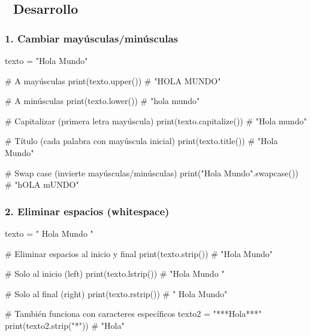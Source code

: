 \documentclass[
  doc,
  floatsintext,
  longtable,
  a4paper,
  nolmodern,
  notxfonts,
  notimes,
  12pt,
  colorlinks=true,linkcolor=blue,citecolor=blue,urlcolor=blue]{apa7}
\newenvironment{Shaded}{\begin{snugshade}}{\end{snugshade}}
\newcommand{\BuiltInTok}[1]{\textcolor[rgb]{0.00,0.23,0.31}{#1}}
\newcommand{\CommentTok}[1]{\textcolor[rgb]{0.37,0.37,0.37}{#1}}
\newcommand{\NormalTok}[1]{\textcolor[rgb]{0.00,0.23,0.31}{#1}}
\newcommand{\OperatorTok}[1]{\textcolor[rgb]{0.37,0.37,0.37}{#1}}
\newcommand{\StringTok}[1]{\textcolor[rgb]{0.13,0.47,0.30}{#1}}
\begin{document}
\subsection{📐 Desarrollo}\label{desarrollo}

\subsubsection{1. Cambiar
mayúsculas/minúsculas}\label{cambiar-mayuxfasculasminuxfasculas}

\begin{Shaded}
\begin{Highlighting}[]
\NormalTok{texto }\OperatorTok{=} \StringTok{"Hola Mundo"}

\CommentTok{\# A mayúsculas}
\BuiltInTok{print}\NormalTok{(texto.upper())   }\CommentTok{\# "HOLA MUNDO"}

\CommentTok{\# A minúsculas}
\BuiltInTok{print}\NormalTok{(texto.lower())   }\CommentTok{\# "hola mundo"}

\CommentTok{\# Capitalizar (primera letra mayúscula)}
\BuiltInTok{print}\NormalTok{(texto.capitalize())  }\CommentTok{\# "Hola mundo"}

\CommentTok{\# Título (cada palabra con mayúscula inicial)}
\BuiltInTok{print}\NormalTok{(texto.title())   }\CommentTok{\# "Hola Mundo"}

\CommentTok{\# Swap case (invierte mayúsculas/minúsculas)}
\BuiltInTok{print}\NormalTok{(}\StringTok{"Hola Mundo"}\NormalTok{.swapcase())  }\CommentTok{\# "hOLA mUNDO"}
\end{Highlighting}
\end{Shaded}

\subsubsection{2. Eliminar espacios
(whitespace)}\label{eliminar-espacios-whitespace}

\begin{Shaded}
\begin{Highlighting}[]
\NormalTok{texto }\OperatorTok{=} \StringTok{"  Hola Mundo  "}

\CommentTok{\# Eliminar espacios al inicio y final}
\BuiltInTok{print}\NormalTok{(texto.strip())      }\CommentTok{\# "Hola Mundo"}

\CommentTok{\# Solo al inicio (left)}
\BuiltInTok{print}\NormalTok{(texto.lstrip())     }\CommentTok{\# "Hola Mundo  "}

\CommentTok{\# Solo al final (right)}
\BuiltInTok{print}\NormalTok{(texto.rstrip())     }\CommentTok{\# "  Hola Mundo"}

\CommentTok{\# También funciona con caracteres específicos}
\NormalTok{texto2 }\OperatorTok{=} \StringTok{"***Hola***"}
\BuiltInTok{print}\NormalTok{(texto2.strip(}\StringTok{"*"}\NormalTok{))  }\CommentTok{\# "Hola"}
\end{Highlighting}
\end{Shaded}
\end{document}
